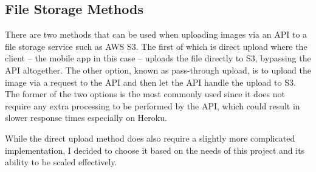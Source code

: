 \subsection{File Storage Methods} \label{subsection:file-storage-methods}

There are two methods that can be used when uploading images via an API to a file storage service such as AWS S3. The first of which is direct upload where the client -- the mobile app in this case -- uploads the file directly to S3, bypassing the API altogether. The other option, known as pass-through upload, is to upload the image via a request to the API and then let the API handle the upload to S3. The former of the two options is the most commonly used since it does not require any extra processing to be performed by the API, which could result in slower response times especially on Heroku.

While the direct upload method does also require a slightly more complicated implementation, I decided to choose it based on the needs of this project and its ability to be scaled effectively.
